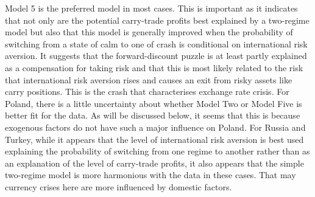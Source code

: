 \documentclass[12pt, a4paper, oneside]{article}\usepackage[]{graphicx}\usepackage[]{color}
\begin{document}
Model 5 is the preferred model in most cases.  This is important as it indicates that not only are the potential carry-trade profits best explained by a two-regime model but also that this model is generally improved when the probability of switching from a state of calm to one of crash is conditional on international risk aversion.  It suggests that the forward-discount puzzle is at least partly explained as a compensation for taking risk and that this is most likely related to the risk that international risk aversion rises and causes an exit from risky assets like carry positions.  This is the crash that characterises exchange rate crisis.  For Poland, there is a little uncertainty about whether Model Two or Model Five is better fit for the data.  As will be discussed below, it seems that this is because exogenous factors do not have such a major influence on Poland. For Russia and Turkey, while it appears that the level of international risk aversion is best used explaining the probability of switching from one regime to another rather than as an explanation of the level of carry-trade profits, it also appears that the simple two-regime model is more harmonious with the data in these cases. That may currency crises here are more influenced by domestic factors. 
\end{document}
